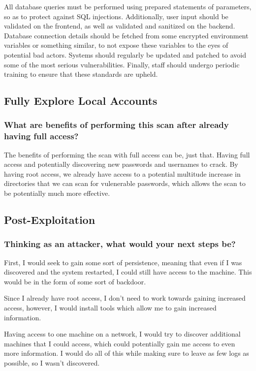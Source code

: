 All database queries must be performed using prepared statements of parameters, so as to protect against SQL injections. Additionally, user input should be validated on the frontend, as well as validated and sanitized on the backend. Database connection details should be fetched from some encrypted environment variables or something similar, to not expose these variables to the eyes of potential bad actors. Systems should regularly be updated and patched to avoid some of the most serious vulnerabilities. Finally, staff should undergo periodic training to ensure that these standards are upheld.

\subsection{Fully Explore Local Accounts}
\subsubsection{What are benefits of performing this scan after already having full access?}
The benefits of performing the scan with full access can be, just that. Having full access and potentially discovering new passwords and usernames to crack. By having root access, we already have access to a potential multitude increase in directories that we can scan for vulenerable passwords, which allows the scan to be potentially much more effective.

\subsection{Post-Exploitation}
\subsubsection{Thinking as an attacker, what would your next steps be?}
First, I would seek to gain some sort of persistence, meaning that even if I was discovered and the system restarted, I could still have access to the machine. This would be in the form of some sort of backdoor.

Since I already have root access, I don't need to work towards gaining increased access, however, I would install tools which allow me to gain increased information.

Having access to one machine on a network, I would try to discover additional machines that I could access, which could potentially gain me access to even more information. I would do all of this while making sure to leave as few logs as possible, so I wasn't discovered.
